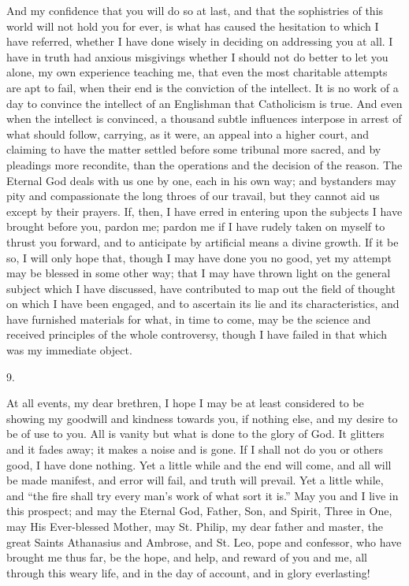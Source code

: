 And my confidence that you will do so at last, and that the
sophistries of this world will not hold you for ever, is what has
caused the hesitation to which I have referred, whether I have done
wisely in deciding on addressing you at all. I have in truth had
anxious misgivings whether I should not do better to let you alone, my
own experience teaching me, that even the most charitable attempts are
apt to fail, when their end is the conviction of the intellect. It is
no work of a day to convince the intellect of an Englishman that
Catholicism is true. And even when the intellect is convinced, a
thousand subtle influences interpose in arrest of what should follow,
carrying, as it were, an appeal into a higher court, and claiming to
have the matter settled before some tribunal more sacred, and by
pleadings more recondite, than the operations and the decision of the
reason. The Eternal God deals with us one by one, each in his own way;
and bystanders may pity and compassionate the long throes of our
travail, but they cannot aid us except by their prayers. If, then, I
have erred in entering upon the subjects I have brought before you,
pardon me; pardon me if I have rudely taken on myself to thrust you
forward, and to anticipate by artificial means a divine growth. If it
be so, I will only hope that, though I may have done you no good, yet
my attempt may be blessed in some other way; that I may have thrown
light on the general subject which I have discussed, have contributed
to map out the field of thought on which I have been engaged, and to
ascertain its lie and its characteristics, and have furnished
materials for what, in time to come, may be the science and received
principles of the whole controversy, though I have failed in that
which was my immediate object.

9.

At all events, my dear brethren, I hope I may be at least
considered to be showing my goodwill and kindness towards you, if
nothing else, and my desire to be of use to you. All is vanity but
what is done to the glory of God. It glitters and it fades away; it
makes a noise and is gone. If I shall not do you or others good, I
have done nothing. Yet a little while and the end will come, and all
will be made manifest, and error will fail, and truth will prevail.
Yet a little while, and ``the fire shall try every man's work of
what sort it is.'' May you and I live in this prospect; and may
the Eternal God, Father, Son, and Spirit, Three in One, may His
Ever-blessed Mother, may St. Philip, my dear father and master, the
great Saints Athanasius and Ambrose, and St. Leo, pope and confessor,
who have brought me thus far, be the hope, and help, and reward of you
and me, all through this weary life, and in the day of account, and in
glory everlasting!
